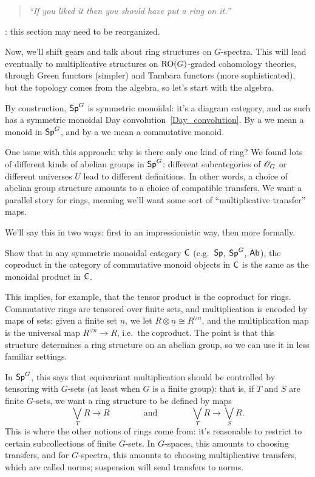 \begin{quote}\textit{
	``If you liked it then you should have put a ring on it.''
}\end{quote}
\TODO: this section may need to be reorganized.

Now, we'll shift gears and talk about ring structures on $G$-spectra. This will lead eventually to multiplicative
structures on $\mathrm{RO}(G)$-graded cohomology theories, through Green functors (simpler) and Tambara functors (more
sophisticated), but the topology comes from the algebra, so let's start with the algebra.

By construction, $\mathsf{Sp}^G$ is symmetric monoidal: it's a diagram category, and as such has a symmetric monoidal Day
convolution~\eqref{Day_convolution}. By a  we mean a monoid in $\mathsf{Sp}^G$, and by a
 we mean a commutative monoid.

One issue with this approach: why is there only one kind of ring? We found lots of different kinds of abelian
groups in $\mathsf{Sp}^G$: different subcategories of $\mathscr O_G$ or different universes $U$ lead to different definitions. In
other words, a choice of abelian group structure amounts to a choice of compatible transfers. We want a parallel
story for rings, meaning we'll want some sort of ``multiplicative transfer'' maps.

We'll say this in two ways: first in an impressionistic way, then more formally.

\begin{ex}
Show that in any symmetric monoidal category $\mathsf C$ (e.g.\ $\mathsf{Sp}$, $\mathsf{Sp}^G$, $\mathsf{Ab}$), the coproduct in the category
of commutative monoid objects in $\mathsf C$ is the same as the monoidal product in $\mathsf C$.
\end{ex}
This implies, for example, that the tensor product is the coproduct for rings.
Commutative rings are tensored over finite sets, and multiplication is encoded by maps of sets: given a finite set
$\underline n$, we let $R\otimes\underline n\cong R^{\lor n}$, and the multiplication map is the universal map
$R^{\vee n}\to R$, i.e.\ the coproduct. The point is that this structure determines a ring structure on an abelian
group, so we can use it in less familiar settings.

In $\mathsf{Sp}^G$, this says that equivariant multiplication should be controlled by tensoring with $G$-sets (at least
when $G$ is a finite group): that is, if $T$ and $S$ are finite $G$-sets, we want a ring structure to be defined by
maps
\[\bigvee_T R\longrightarrow R\qquad\qquad\text{and}\qquad\qquad\bigvee_T
R\longrightarrow\bigvee_S R.\]
This is where the other notions of rings come from: it's reasonable to restrict to certain subcollections of finite
$G$-sets. In $G$-spaces, this amounts to choosing transfers, and for $G$-spectra, this amounts to choosing
multiplicative transfers, which are called norms; suspension will send transfers to norms.

